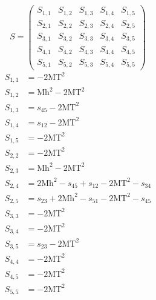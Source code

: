 \documentclass[a4paper]{article}
\begin{document}
\begin{equation}
S=\left(\begin{array}{ccccc}
   S_{1,1}&
   S_{1,2}&
   S_{1,3}&
   S_{1,4}&
   S_{1,5}\\
   S_{2,1}&
   S_{2,2}&
   S_{2,3}&
   S_{2,4}&
   S_{2,5}\\
   S_{3,1}&
   S_{3,2}&
   S_{3,3}&
   S_{3,4}&
   S_{3,5}\\
   S_{4,1}&
   S_{4,2}&
   S_{4,3}&
   S_{4,4}&
   S_{4,5}\\
   S_{5,1}&
   S_{5,2}&
   S_{5,3}&
   S_{5,4}&
   S_{5,5}\end{array}\right)
\end{equation}
\begin{subequations}
\begin{align}
   S_{1,1}&=-2\text{MT}^2\\
   S_{1,2}&=\text{Mh}^2-2\text{MT}^2\\
   S_{1,3}&=s_{45}-2\text{MT}^2\\
   S_{1,4}&=s_{12}-2\text{MT}^2\\
   S_{1,5}&=-2\text{MT}^2\\
   S_{2,2}&=-2\text{MT}^2\\
   S_{2,3}&=\text{Mh}^2-2\text{MT}^2\\
   S_{2,4}&=2\text{Mh}^2-s_{45}+s_{12}-2\text{MT}^2-s_{34}\\
   S_{2,5}&=s_{23}+2\text{Mh}^2-s_{51}-2\text{MT}^2-s_{45}\\
   S_{3,3}&=-2\text{MT}^2\\
   S_{3,4}&=-2\text{MT}^2\\
   S_{3,5}&=s_{23}-2\text{MT}^2\\
   S_{4,4}&=-2\text{MT}^2\\
   S_{4,5}&=-2\text{MT}^2\\
   S_{5,5}&=-2\text{MT}^2
\end{align}
\end{subequations}
\end{document}
